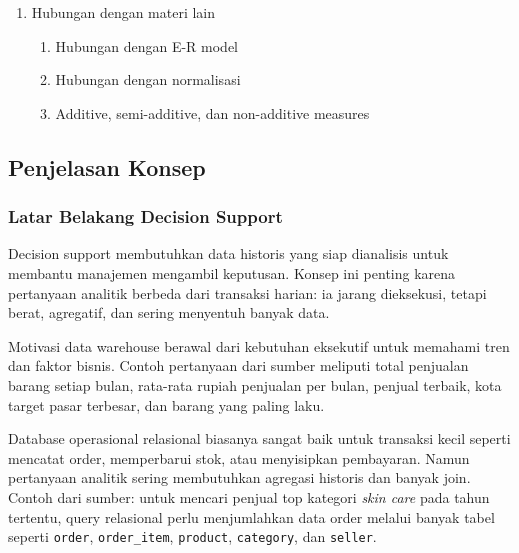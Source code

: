 \begin{enumerate}
\begin{enumerate}
        \item \ppaham Slice, dice, pivot, cross-tabulation
        \item \ppaham \texttt{cube} dan \texttt{rollup}
    \end{enumerate}
    \item \ppaham Hubungan dengan materi lain
    \begin{enumerate}
        \item \ppaham Hubungan dengan E-R model
        \item \ppaham Hubungan dengan normalisasi
        \item \ppaham Additive, semi-additive, dan non-additive measures
    \end{enumerate}
\end{enumerate}

\subsection{Penjelasan Konsep}

\subsubsection{Latar Belakang Decision Support}

\begin{jawab}
Decision support membutuhkan data historis yang siap dianalisis untuk membantu manajemen mengambil keputusan. Konsep ini penting karena pertanyaan analitik berbeda dari transaksi harian: ia jarang dieksekusi, tetapi berat, agregatif, dan sering menyentuh banyak data.
\end{jawab}

Motivasi data warehouse berawal dari kebutuhan eksekutif untuk memahami tren dan faktor bisnis. Contoh pertanyaan dari sumber meliputi total penjualan barang setiap bulan, rata-rata rupiah penjualan per bulan, penjual terbaik, kota target pasar terbesar, dan barang yang paling laku.

Database operasional relasional biasanya sangat baik untuk transaksi kecil seperti mencatat order, memperbarui stok, atau menyisipkan pembayaran. Namun pertanyaan analitik sering membutuhkan agregasi historis dan banyak join. Contoh dari sumber: untuk mencari penjual top kategori \textit{skin care} pada tahun tertentu, query relasional perlu menjumlahkan data order melalui banyak tabel seperti \texttt{order}, \texttt{order\_item}, \texttt{product}, \texttt{category}, dan \texttt{seller}.

